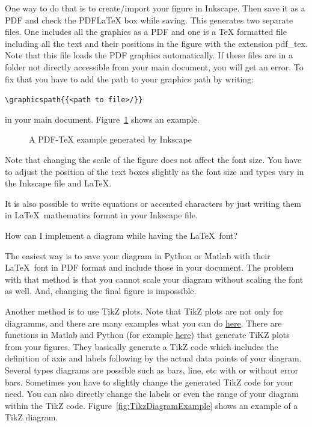 \begin{QandA}
	\begin{answered}
		One way to do that is to create/import your figure in Inkscape. Then save it as a PDF and check the PDFLaTeX box while saving. This generates two separate files. One includes all the graphics as a PDF and one is a TeX formatted file including all the text and their positions in the figure with the extension pdf\_tex. Note that this file loads the PDF graphics automatically. If these files are in a folder not directly accessible from your main document, you will get an error. To fix that you have to add the path to your graphics path by writing:
		
		\verb|\graphicspath{{<path to file>/}}| 
		
		in your main document. Figure~\ref{fig:InkScapeExample} shows an example.
		
	\begin{figure}[ht]
	\centering
	\def\svgwidth{0.9\textwidth}
	
    	
  		\caption{A PDF-TeX example generated by Inkscape}
		\label{fig:InkScapeExample}

	\end{figure}
	
		Note that changing the scale of the figure does not affect the font size. You have to adjust the position of the text boxes slightly as the font size and types vary in the Inkscape file and \LaTeX.
		
		It is also possible to write equations or accented characters by just writing them in \LaTeX \, mathematics format in your Inkscape file.	
	
	\end{answered}	


\item How can I implement a diagram while having the \LaTeX\ font?

	\begin{answered}
		The easiest way is to save your diagram in Python or Matlab with their \LaTeX\ font in PDF format and include those in your document. The problem with that method is that you cannot scale your diagram without scaling the font as well. And, changing the final figure is impossible.
		
		Another method is to use TikZ plots. Note that TikZ plots are not only for diagramms, and there are many examples what you can do \href{http://www.texample.net/tikz/}{here}. There are functions in Matlab and Python (for example \href{https://github.com/matlab2tikz/matlab2tikz}{here}) that generate TiKZ plots from your figures. They basically generate a TikZ code which includes the definition of axis and labels following by the actual data points of your diagram. Several types diagrams are possible such as bars, line, etc with or without error bars. Sometimes you have to slightly change the generated TikZ code for your need. You can also directly change the labels or even the range of your diagram within the TikZ code. Figure~\ref{fig:TikzDiagramExample} shows an example of a TikZ diagram.
		

\end{answered}
\end{QandA}
